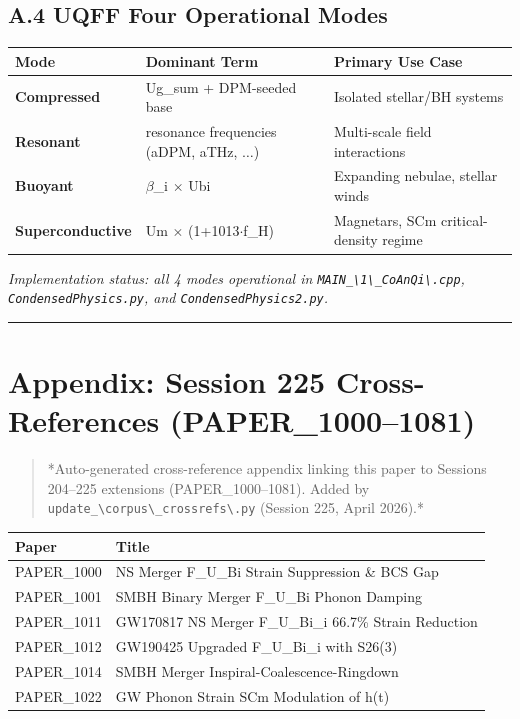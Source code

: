 \documentclass[12pt,a4paper]{article}
\begin{document}
\subsection{A.4 UQFF Four Operational Modes}

\begin{table}[H]
\centering
\small
\begin{tabularx}{\linewidth}{@{}>{\raggedright\arraybackslash}X>{\raggedright\arraybackslash}X>{\raggedright\arraybackslash}X@{}}
\toprule
Mode & Dominant Term & Primary Use Case \tabularnewline
\midrule
\textbf{Compressed} & Ug\_sum + DPM-seeded base & Isolated stellar/BH systems \tabularnewline
\textbf{Resonant} & 5 resonance frequencies (aDPM, aTHz, $\ldots${}) & Multi-scale field interactions \tabularnewline
\textbf{Buoyant} & $\beta$\_i $\times$ Ubi & Expanding nebulae, stellar winds \tabularnewline
\textbf{Superconductive} & Um $\times$ (1+1013$\cdot$f\_H) & Magnetars, SCm critical-density regime \tabularnewline
\bottomrule
\end{tabularx}
\end{table}

\emph{Implementation status: all 4 modes operational in \texttt{MAIN\_\textbackslash {1\textbackslash \_CoAnQi\textbackslash }.cpp}, \texttt{CondensedPhysics.py}, and \texttt{CondensedPhysics2.py}.}

\medskip\hrule\medskip

\section{Appendix: Session 225 Cross-References (PAPER\_1000--1081)}

\begin{quote}
*Auto-generated cross-reference appendix linking this paper to
Sessions 204--225 extensions (PAPER\_1000--1081). Added by
\texttt{update\_\textbackslash {corpus\textbackslash \_crossrefs\textbackslash }.py} (Session 225, April 2026).*
\end{quote}

\begin{table}[H]
\centering
\small
\begin{tabularx}{\linewidth}{@{}>{\raggedright\arraybackslash}X>{\raggedright\arraybackslash}X@{}}
\toprule
Paper & Title \tabularnewline
\midrule
PAPER\_1000 & NS Merger F\_{U\_Bi} Strain Suppression \& BCS Gap \tabularnewline
PAPER\_1001 & SMBH Binary Merger F\_{U\_Bi} Phonon Damping \tabularnewline
PAPER\_1011 & GW170817 NS Merger F\_{U\_Bi\_i} 66.7\% Strain Reduction \tabularnewline
PAPER\_1012 & GW190425 Upgraded F\_{U\_Bi\_i} with S26(3) \tabularnewline
PAPER\_1014 & SMBH Merger Inspiral-Coalescence-Ringdown \tabularnewline
PAPER\_1022 & GW Phonon Strain SCm Modulation of h(t) \tabularnewline
\bottomrule
\end{tabularx}
\end{table}
\end{document}
